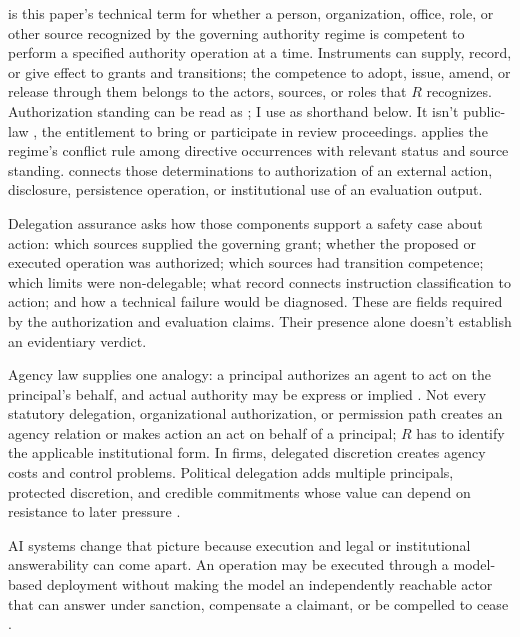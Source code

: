  is this paper's technical term for whether a person, organization, office, role, or other source recognized by the governing authority regime is competent to perform a specified authority operation at a time. Instruments can supply, record, or give effect to grants and transitions; the competence to adopt, issue, amend, or release through them belongs to the actors, sources, or roles that \(R\) recognizes. Authorization standing can be read as ; I use  as shorthand below. It isn't public-law , the entitlement to bring or participate in review proceedings.  applies the regime's conflict rule among directive occurrences with relevant status and source standing.  connects those determinations to authorization of an external action, disclosure, persistence operation, or institutional use of an evaluation output.

Delegation assurance asks how those components support a safety case about action: which sources supplied the governing grant; whether the proposed or executed operation was authorized; which sources had transition competence; which limits were non-delegable; what record connects instruction classification to action; and how a technical failure would be diagnosed. These are fields required by the authorization and evaluation claims. Their presence alone doesn't establish an evidentiary verdict.

Agency law supplies one analogy: a principal authorizes an agent to act on the principal's behalf, and actual authority may be express or implied \parencite{cornellWexAgency,cornellWexActualAuthority}. Not every statutory delegation, organizational authorization, or permission path creates an agency relation or makes action an act on behalf of a principal; \(R\) has to identify the applicable institutional form. In firms, delegated discretion creates agency costs and control problems. Political delegation adds multiple principals, protected discretion, and credible commitments whose value can depend on resistance to later pressure \parencite{jensen1976theory,miller2005political}.

AI systems change that picture because execution and legal or institutional answerability can come apart. An operation may be executed through a model-based deployment without making the model an independently reachable actor that can answer under sanction, compensate a claimant, or be compelled to cease \parencite{rajagopalan2026governingAgenticAI}.

